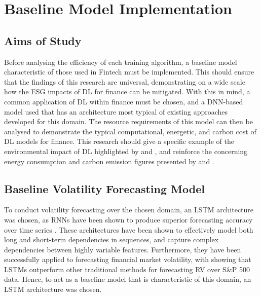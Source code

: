 \documentclass[a4paper, 11pt]{report}
\begin{document}
    \section{Baseline Model Implementation}
    \label{section: baseline}

    \subsection{Aims of Study}

    Before analysing the efficiency of each training algorithm, a baseline model characteristic of those used in Fintech must be implemented. This should ensure that the findings of this research are universal, demonstrating on a wide scale how the ESG impacts of DL for finance can be mitigated. With this in mind, a common application of DL within finance must be chosen, and a DNN-based model used that has an architecture most typical of existing approaches developed for this domain. The resource requirements of this model can then be analysed to demonstrate the typical computational, energetic, and carbon cost of DL models for finance. This research should give a specific example of the environmental impact of DL highlighted by \citet{schwartz-2019} and \citet{strubell-2019}, and reinforce the concerning energy consumption and carbon emission figures presented by \citet{hockstad-2018} and \citet{masanet-2020}.


    \subsection{Baseline Volatility Forecasting Model}
    \label{section: model-architecture}

    To conduct volatility forecasting over the chosen domain, an LSTM architecture was chosen, as RNNs have been shown to produce superior forecasting accuracy over time series \citep{fjellstrom-2022}. These architectures have been shown to effectively model both long and short-term dependencies in sequences, and capture complex dependencies between highly variable features. Furthermore, they have been successfully applied to forecasting financial market volatility, with \citet{bucci-2020} showing that LSTMs outperform other traditional methods for forecasting RV over S\&P 500 data. Hence, to act as a baseline model that is characteristic of this domain, an LSTM architecture was chosen.
\end{document}
